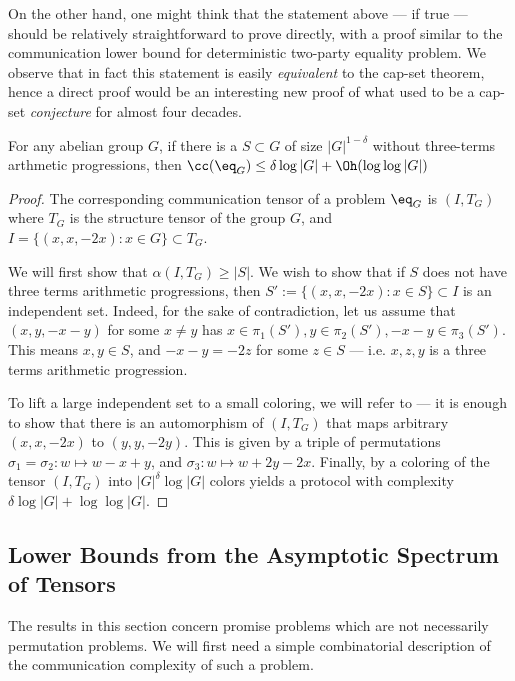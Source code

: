 On the other hand, one might think that the statement above --- if true --- should be relatively straightforward to prove directly, with a proof similar to the communication lower bound for deterministic two-party equality problem. We observe that in fact this statement is easily \emph{equivalent} to the cap-set theorem, hence a direct proof would be an interesting new proof of what used to be a cap-set \emph{conjecture} for almost four decades.

\begin{fact}
For any abelian group $G$, if there is a $S \subset G$ of size $|G|^{1-\delta}$ without three-terms arthmetic progressions, then $\cc(\eq_G) \leq \delta \log |G| + \Oh(\log \log |G|)$
\end{fact}
\begin{proof}
The corresponding communication tensor of a problem $\eq_G$ is $(I, T_G)$ where $T_G$ is the structure tensor of the group $G$, and $I = \{ (x,x, -2x) : x \in G \} \subset T_G$.

We will first show that $\alpha(I, T_G) \geq |S|$. We wish to show that if $S$ does not have three terms arithmetic progressions, then $S' := \{ (x,x, -2x) : x \in S \} \subset I$ is an independent set. Indeed, for the sake of contradiction, let us assume that $(x,y,-x-y)$ for some $x\not=y$ has $x \in \pi_1(S'), y \in \pi_2(S'), -x-y \in \pi_3(S')$. This means $x,y \in S$, and $-x-y = - 2z$ for some $z \in S$ --- i.e. $x,z,y$ is a three terms arithmetic progression.

To lift a large independent set to a small coloring, we will refer to  --- it is enough to show that there is an automorphism of $(I, T_G)$ that maps arbitrary $(x,x,-2x)$ to $(y,y,-2y)$. This is given by a triple of permutations $\sigma_1 = \sigma_2 : w \mapsto w - x + y$, and $\sigma_3 : w \mapsto w + 2y - 2x$. Finally, by  a coloring of the tensor $(I, T_G)$ into $|G|^{\delta} \log |G|$ colors yields a protocol with complexity $\delta \log |G|  + \log \log |G|$.
\end{proof}



\subsection{Lower Bounds from the Asymptotic Spectrum of Tensors}
The results in this section concern promise problems which are not necessarily permutation problems. We will first need a simple combinatorial description of the communication complexity of such a problem.

